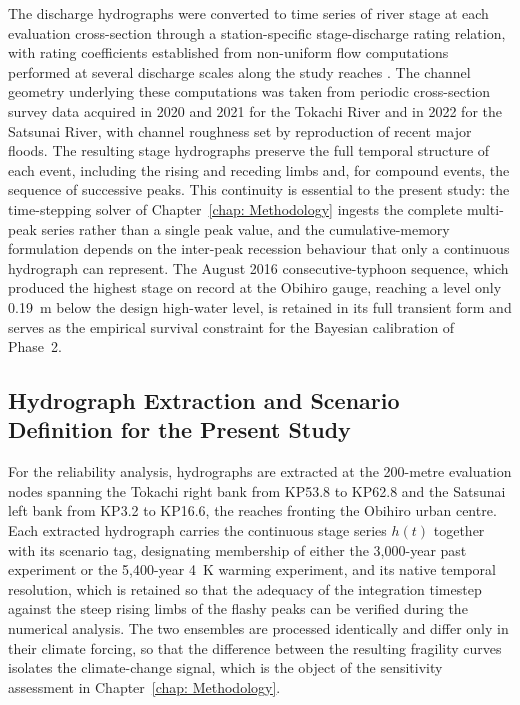 The discharge hydrographs were converted to time series of river stage at each evaluation cross-section through a station-specific stage-discharge rating relation, with rating coefficients established from non-uniform flow computations performed at several discharge scales along the study reaches \parencite{uemura_phd_2025}. The channel geometry underlying these computations was taken from periodic cross-section survey data acquired in 2020 and 2021 for the Tokachi River and in 2022 for the Satsunai River, with channel roughness set by reproduction of recent major floods. The resulting stage hydrographs preserve the full temporal structure of each event, including the rising and receding limbs and, for compound events, the sequence of successive peaks. This continuity is essential to the present study: the time-stepping solver of Chapter~\ref{chap: Methodology} ingests the complete multi-peak series rather than a single peak value, and the cumulative-memory formulation depends on the inter-peak recession behaviour that only a continuous hydrograph can represent. The August 2016 consecutive-typhoon sequence, which produced the highest stage on record at the Obihiro gauge, reaching a level only 0.19~m below the design high-water level, is retained in its full transient form and serves as the empirical survival constraint for the Bayesian calibration of Phase~2.

\subsection{Hydrograph Extraction and Scenario Definition for the Present Study}
\label{subsec: Hydrograph Extraction and Scenario Definition for the Present Study}

For the reliability analysis, hydrographs are extracted at the 200-metre evaluation nodes spanning the Tokachi right bank from KP53.8 to KP62.8 and the Satsunai left bank from KP3.2 to KP16.6, the reaches fronting the Obihiro urban centre. Each extracted hydrograph carries the continuous stage series $h(t)$ together with its scenario tag, designating membership of either the 3{,}000-year past experiment or the 5{,}400-year 4~K warming experiment, and its native temporal resolution, which is retained so that the adequacy of the integration timestep against the steep rising limbs of the flashy peaks can be verified during the numerical analysis. The two ensembles are processed identically and differ only in their climate forcing, so that the difference between the resulting fragility curves isolates the climate-change signal, which is the object of the sensitivity assessment in Chapter~\ref{chap: Methodology}.

